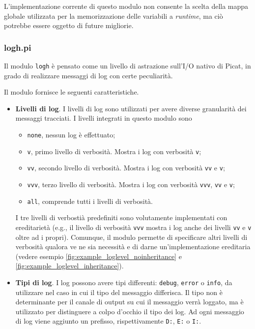 \documentclass[12pt,a4paper,openright]{book} %
\begin{document}
L'implementazione corrente di questo modulo non consente la scelta
della mappa globale utilizzata per la memorizzazione delle variabili a
\emph{runtime}, ma ciò potrebbe essere oggetto di future migliorie.

\subsubsection{log\textunderscore h.pi}

Il modulo \texttt{log\textunderscore h} è pensato come un livello di
astrazione sull'I/O nativo di Picat, in grado di realizzare messaggi
di log con certe peculiarità.

Il modulo fornisce le seguenti caratteristiche.

\begin{itemize}
	\item \textbf{Livelli di log}. I livelli di log sono
          utilizzati per avere diverse granularità dei messaggi
          tracciati. I livelli integrati in questo modulo sono
	\begin{itemize}
		\item \texttt{none}, nessun log è effettuato;
		\item \texttt{v}, primo livello di verbosità. Mostra i
                  log con verbosità \texttt{v};
		\item \texttt{vv}, secondo livello di
                  verbosità. Mostra i log con verbosità \texttt{vv} e
                  \texttt{v};
		\item \texttt{vvv}, terzo livello di verbosità. Mostra
                  i log con verbosità \texttt{vvv}, \texttt{vv} e
                  \texttt{v};
		\item \texttt{all}, comprende tutti i livelli di
                  verbosità.
	\end{itemize}
	I tre livelli di verbostià predefiniti sono volutamente
        implementati con ereditarietà (e.g., il livello di verbosità
        \texttt{vvv} mostra i log anche dei livelli \texttt{vv} e
        \texttt{v} oltre ad i propri). Comunque, il modulo permette di
        specificare altri livelli di verbosità qualora ve ne sia
        necessità e di darne un'implementazione ereditaria (vedere
        esempio \ref{fig:example_loglevel_noinheritance} e
        \ref{fig:example_loglevel_inheritance}).

	\item \textbf{Tipi di log}. I log possono avere tipi
          differenti: \texttt{debug}, \texttt{error} o \texttt{info},
          da utilizzare nel caso in cui il tipo del messaggio
          differisca. Il tipo non è determinante per il canale di
          output su cui il messaggio verrà loggato, ma è utilizzato
          per distinguere a colpo d'occhio il tipo dei log. Ad ogni
          messaggio di log viene aggiunto un prefisso, rispettivamente
          \texttt{D:}, \texttt{E:} o \texttt{I:}.


\end{itemize}
\end{document}
